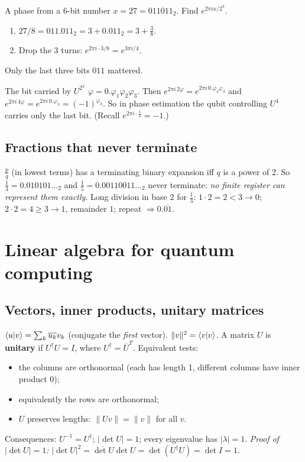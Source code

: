 \documentclass[11pt,a4paper,openany]{book}
\newcounter{wex}[chapter]
\newenvironment{steps}{\begin{enumerate}[label=\textbf{Step \arabic*.}, leftmargin=4.2em, itemsep=2pt]}{\end{enumerate}}
\begin{document}
\begin{wexample}{A phase from a 6-bit number}
$x = 27 = 011011_2$. Find $e^{2\pi i x/2^3}$.
\begin{steps}
\item $27/8 = 011.011_2 = 3 + 0.011_2 = 3 + \frac38$.
\item Drop the 3 turns: $e^{2\pi i\cdot 3/8} = e^{3\pi i/4}$.
\end{steps}
Only the last three bits $011$ mattered.
\end{wexample}

\begin{wexample}{The bit carried by $U^{2^k}$}
$\varphi = 0.\varphi_1\varphi_2\varphi_3$. Then $e^{2\pi i\,2\varphi} = e^{2\pi i\,0.\varphi_2\varphi_3}$ and $e^{2\pi i\,4\varphi} = e^{2\pi i\,0.\varphi_3} = (-1)^{\varphi_3}$.
So in phase estimation the qubit controlling $U^4$ carries only the last bit. (Recall $e^{2\pi i\cdot\frac12} = -1$.)
\end{wexample}

\subsection{Fractions that never terminate}
$\frac{p}{q}$ (in lowest terms) has a terminating binary expansion iff $q$ is a power of 2. So $\frac13 = 0.010101\ldots_2$ and
$\frac15 = 0.00110011\ldots_2$ never terminate: \emph{no finite register can represent them exactly}.
Long division in base 2 for $\frac13$: $1\cdot2 = 2 < 3 \to 0$; $2\cdot2 = 4 \ge 3 \to 1$, remainder $1$; repeat $\Rightarrow 0.\overline{01}$.

\section{Linear algebra for quantum computing}
\subsection{Vectors, inner products, unitary matrices}
$\braket{u|v} = \sum_k \overline{u_k}v_k$ (conjugate the \emph{first} vector). $\|v\|^2 = \braket{v|v}$.
A matrix $U$ is \textbf{unitary} if $U^\dagger U = I$, where $U^\dagger = \overline{U}^T$. Equivalent tests:
\begin{itemize}[itemsep=1pt]
\item the columns are orthonormal (each has length 1, different columns have inner product 0);
\item equivalently the rows are orthonormal;
\item $U$ preserves lengths: $\|Uv\| = \|v\|$ for all $v$.
\end{itemize}
Consequences: $U^{-1} = U^\dagger$; $|\det U| = 1$; every eigenvalue has $|\lambda| = 1$.
\emph{Proof of $|\det U| = 1$:} $|\det U|^2 = \overline{\det U}\det U = \det(U^\dagger U) = \det I = 1$.
\end{document}
